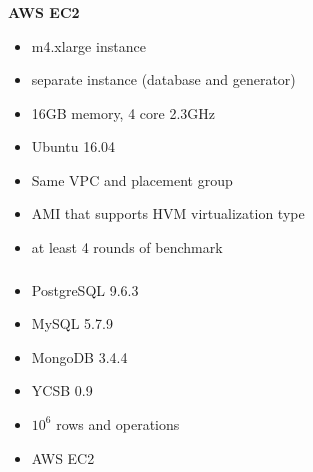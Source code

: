 \documentclass[usenames,dvipsnames, 18pt, compress, aspectratio=169]{beamer}
\begin{document}
%
\begin{frame}
    \frametitle{}
\end{frame}

\begin{frame}
    \frametitle{}
    \begin{center}
        \textbf{AWS EC2}
        \begin{itemize}[label={}]
            \item m4.xlarge instance
            \item separate instance (database and generator)
            \item 16GB memory, 4 core 2.3GHz
            \item Ubuntu 16.04
            \item Same VPC and placement group
            \item AMI that supports HVM virtualization type
            \item at least 4 rounds of benchmark
        \end{itemize}
    \end{center}
\end{frame}

\begin{frame}
    \frametitle{}
    \begin{center}
        \begin{itemize}[label={}]
            \item PostgreSQL 9.6.3
            \item MySQL 5.7.9
            \item MongoDB 3.4.4
            \item YCSB 0.9
            \item $10^6$ rows and operations
            \item AWS EC2
        \end{itemize}
    \end{center}
\end{frame}
\end{document}

